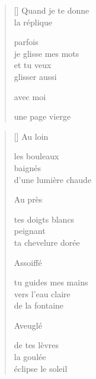 \documentclass[12pt,a4paper]{article}
\begin{document}

\newpage

\poemtitle{}

\settowidth{\versewidth}{je glisse mes mots}

\bigskip

\begin{verse}[\versewidth]
  Quand je te donne \\
  la réplique

  parfois \\
  je glisse mes mots \\
  et tu veux \\
  glisser aussi

  avec moi

  une page vierge
\end{verse}


\newpage

\poemtitle{}

\settowidth{\versewidth}{d'une lumière chaude}

\bigskip

\begin{verse}[\versewidth]
  Au loin

  les bouleaux \\
  baignés \\
  d'une lumière chaude

  Au près

  tes doigts blancs \\
  peignant \\
  ta chevelure dorée

  Assoiffé

  tu guides mes mains \\
  vers l'eau claire \\
  de la fontaine

  Aveuglé

  de tes lèvres \\
  la goulée \\
  éclipse le soleil
\end{verse}


\newpage

\poemtitle{}

\settowidth{\versewidth}{Mais les métaphores murmuraient}
\end{document}
